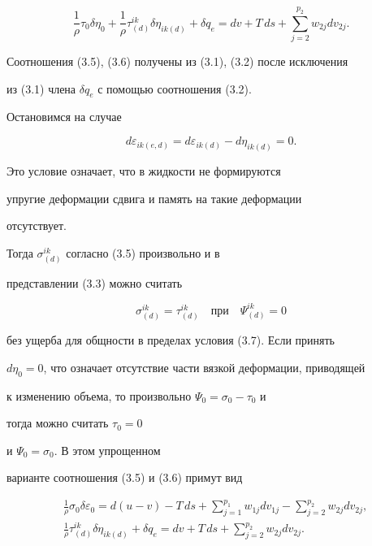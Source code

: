 \begin{equation}


\frac{1}{\rho }\tau_0\delta\eta_0+\frac{1}{\rho }


\tau^{ik}_{(d)}\delta\eta_{ik(d)}+\delta q_e=dv+T\,ds


+\sum^{p_2}_{j=2}w_{2j}dv_{2j}.\tag{3.6}


\end{equation}


Соотношения (3.5), (3.6) получены из (3.1), (3.2) после исключения


из (3.1) члена $\delta q_e$ с помощью соотношения (3.2).





Остановимся на случае


\begin{equation}


d\varepsilon_{ik(e,d)}=d\varepsilon_{ik(d)}-


d\eta_{ik(d)}=0.\tag{3.7}


\end{equation}


Это условие означает, что в жидкости не формируются


упругие деформации сдвига и память на такие деформации


отсутствует.


Тогда $\sigma^{ik}_{(d)}$ согласно (3.5) произвольно и в


представлении (3.3) можно считать


\begin{equation}


\sigma^{ik}_{(d)}=\tau^{ik}_{(d)}\quad\text{при}\quad


\Psi^{ik}_{(d)}=0\tag{3.8}


\end{equation}


без ущерба для общности в пределах условия (3.7). Если принять


$d\eta_0=0$, что означает отсутствие части вязкой деформации, приводящей


к изменению объема, то произвольно $\Psi_0=\sigma_0-\tau_0$ и


тогда можно считать $\tau_0=0$


и $\Psi_0=\sigma_0$. В этом упрощенном


варианте соотношения (3.5) и (3.6) примут вид


\begin{align}


&\frac{1}{\rho }\sigma_0\delta\varepsilon_0=d(u-v)-T\,ds+


\sum^{p_1}_{j=1}w_{1j}dv_{1j}-\sum^{p_2}_{j=2}w_{2j}dv_{2j},\tag{3.9}\\


&\frac{1}{\rho }\tau^{ik}_{(d)}\delta\eta_{ik(d)}+\delta q_e=


dv+T\,ds+\sum^{p_2}_{j=2}w_{2j}dv_{2j}.\tag{3.10}


\end{align}





